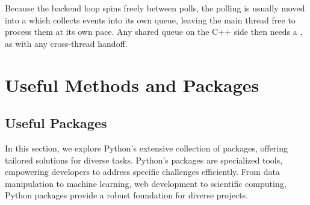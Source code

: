 Because the backend loop spins freely between polls, the polling is usually moved into a  which collects events into its own queue, leaving the main thread free to process them at its own pace. Any shared queue on the C++ side then needs a , as with any cross-thread handoff.

























\section{Useful Methods and Packages}


\subsection{Useful Packages}

In this section, we explore Python's extensive collection of packages, offering tailored solutions for diverse tasks. Python's packages are specialized tools, empowering developers to address specific challenges efficiently. From data manipulation to machine learning, web development to scientific computing, Python packages provide a robust foundation for diverse projects.




\subsubsection{}

